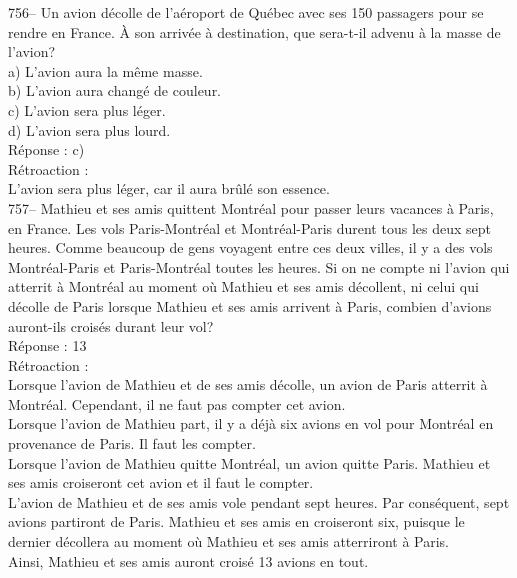 ﻿\documentclass[letterpaper, 12pt]{article}
\begin{document}
756-- Un avion d\'ecolle de l'a\'eroport de Qu\'ebec avec ses 150 passagers
pour se rendre en France.  \`A son arriv\'ee \`a destination, que sera-t-il
advenu \`a la masse de l'avion?\\
a) L'avion aura la m\^eme masse.\\
b) L'avion aura chang\'e de couleur.\\
c) L'avion sera plus l\'eger.\\
d) L'avion sera plus lourd.\\

R\'eponse : c)\\

R\'etroaction : \\
L'avion sera plus l\'eger, car il aura br\^ul\'e son essence.\\

757-- Mathieu et ses amis quittent Montr\'eal pour passer leurs vacances \`a
Paris, en France.  Les vols Paris-Montr\'eal et Montr\'eal-Paris durent tous
les deux sept heures.  Comme beaucoup de gens voyagent entre ces deux
villes, il y a des vols Montr\'eal-Paris et Paris-Montr\'eal toutes les
heures.  Si on ne compte ni l'avion qui atterrit \`a Montr\'eal au moment
o\`u Mathieu et ses amis d\'ecollent, ni celui qui d\'ecolle de Paris
lorsque Mathieu et ses amis arrivent \`a Paris, combien d'avions auront-ils
crois\'es durant leur vol?\\

R\'eponse : 13\\

R\'etroaction : \\
Lorsque l'avion de Mathieu et de ses amis d\'ecolle, un avion de Paris
atterrit \`a Montr\'eal. Cependant, il ne faut pas compter cet avion.\\
Lorsque l'avion de Mathieu part, il y a d\'ej\`a six avions en vol pour
Montr\'eal en provenance de Paris.  Il faut les compter.\\
Lorsque l'avion de Mathieu quitte Montr\'eal, un avion quitte Paris.
Mathieu et ses amis croiseront cet avion et il faut le compter.\\
L'avion de Mathieu et de ses amis vole pendant sept heures.  Par
cons\'equent, sept avions partiront de Paris.  Mathieu et ses amis en
croiseront six, puisque le dernier d\'ecollera au moment o\`u Mathieu et ses
amis atterriront \`a Paris.\\
Ainsi, Mathieu et ses amis auront crois\'e 13 avions en tout.  \\
\end{document}
